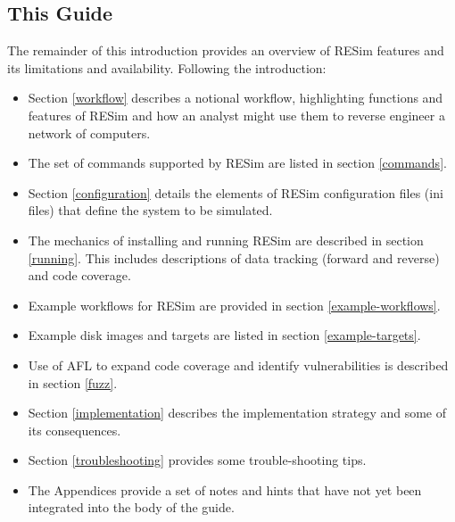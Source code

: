 \documentclass[titlepage]{article}
\begin{document}
\subsection{This Guide}
The remainder of this introduction provides an overview of RESim features and its limitations and availability.  Following the introduction:
\begin{itemize}
\item Section \ref{workflow} 
describes a notional workflow, highlighting functions and features of RESim and how an analyst might use them to reverse engineer a 
network of computers.  
\item The set of commands supported by RESim are listed in section \ref{commands}.  
\item Section \ref{configuration} details
the elements of RESim configuration files (ini files) that define the system to be simulated.  
\item The mechanics of installing and running 
RESim are described in section \ref{running}.  This includes descriptions of data tracking (forward and reverse) and code coverage. 
\item Example workflows for RESim are provided in section \ref{example-workflows}.  
\item Example disk images and targets are listed in section \ref{example-targets}.
\item Use of AFL to expand code coverage and identify vulnerabilities is described in section \ref{fuzz}.
\item Section \ref{implementation} describes the implementation strategy and some of its consequences.
\item Section \ref{troubleshooting} provides some trouble-shooting tips.
\item The Appendices provide a set of notes and hints that have not yet been integrated into the body of the guide.
\end{itemize}
\end{document}
